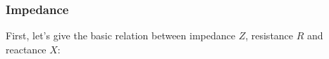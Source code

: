 \documentclass[UTF8]{article}
\begin{document}
\subsubsection{Impedance}
First, let's give the basic relation between impedance $Z$, resistance $R$ and reactance $X$:

\end{document}
